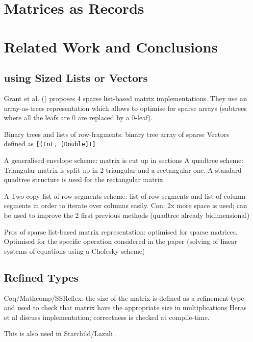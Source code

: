 \documentclass[runningheads]{llncs}
\begin{document}
\section{Matrices as Records}


\section{Related Work and Conclusions}
\subsection{using Sized Lists or Vectors}

Grant et al. (\cite{grant_sparse_1996}) proposes 4 sparse list-based matrix implementations. They use an array-as-trees representation which allows to optimise for sparse arrays (subtrees where all the leafs are 0 are replaced by a 0-leaf).

Binary trees and lists of row-fragments: binary tree array of sparse Vectors defined as \lstinline{[(Int, [Double])]}

A generalised envelope scheme: matrix is cut up in sections
A quadtree scheme: Triangular matrix is split up in 2 triangular and a rectangular one. 
A standard quadtree structure is used for the rectangular matrix.

A Two-copy list of row-segments scheme: list of row-segments and list of column-segments in order to iterate over columns easily. Con: 2x more space is used; can be used to improve the 2 first previous methods (quadtree already bidimensional)

Pros of sparse list-based matrix representation: optimised for sparse matrices. Optimised for the specific operation considered in the paper (solving of linear systems of equations using a Cholesky scheme)



\subsection{Refined Types}
%
Coq/Mathcomp/SSReflex: the size of the matrix is defined as a refinement type and used to check that matrix have the appropriate size in multiplications
Heras et al \cite{heras_incidence_2011} discuss implementation; correctness is checked at compile-time.

This is also used in Starchild/Lazuli \cite{kokke_neural_2020}.
\end{document}
